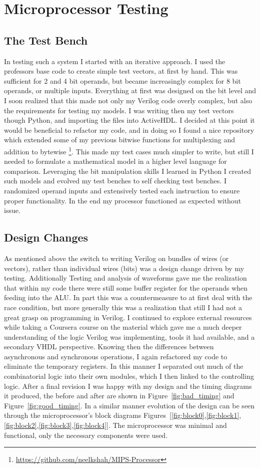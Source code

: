 \documentclass{article}
\begin{document}
\section{Microprocessor Testing}
\subsection{The Test Bench}
In testing such a system I started with an iterative approach.
I used the professors base code to create simple test vectors, at first by hand. 
This was sufficient for 2 and 4 bit operands, but became increasingly complex for 8 bit operands, or multiple inputs. 
Everything at first was designed on the bit level and I soon realized that this made not only my Verilog code overly complex, but also the requirements for testing my models. 
I was writing then my test vectors though Python, and importing the files into ActiveHDL. 
I decided at this point it would be beneficial to refactor my code, and in doing so I found a nice repository which extended some of my previous bitwise functions for multiplexing and addition to bytewise \footnote{\url{https://github.com/neelkshah/MIPS-Processor}}.
This made my test cases much simpler to write, but still I needed to formulate a mathematical model in a higher level language for comparison. 
Leveraging the bit manipulation skills I learned in Python I created such models and evolved my test benches to self checking test benches. 
I randomized operand inputs and extensively tested each instruction to ensure proper functionality. 
In the end my processor functioned as expected without issue. 

\subsection{Design Changes}
As mentioned above the switch to writing Verilog on bundles of wires (or vectors), rather than individual wires (bits) was a design change driven by my testing. 
Additionally Testing and analysis of waveforms gave me the realization that within my code there were still some buffer register for the operands when feeding into the ALU. 
In part this was a countermeasure to at first deal with the race condition, but more generally this was a realization that still I had not a great grasp on programming in Verilog. 
I continued to explore external resources while taking a Coursera course on the material which gave me a much deeper understanding of the logic Verilog was implementing, tools it had available, and a secondary VHDL perspective. 
Knowing then the differences between asynchronous and synchronous operations, I again refactored my code to eliminate the temporary registers. 
In this manner I separated out much of the combinatorial logic into their own modules, which I then linked to the controlling logic. 
After a final revision I was happy with my design and the timing diagrams it produced, the before and after are shown in Figure~\ref{fig:bad_timing} and Figure~\ref{fig:good_timing}.
In a similar manner evolution of the design can be seen through the microprocessor's block diagrams Figures~[\ref{fig:block0},\ref{fig:block1},\ref{fig:block2},\ref{fig:block3},\ref{fig:block4}]. 
The microprocessor was minimal and functional, only the necessary components were used. 
\end{document}

